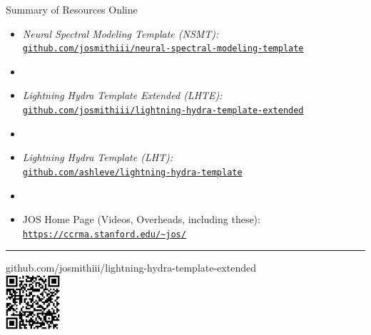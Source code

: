 \begin{slide}[\slideopts,toc={}]{Summary of Resources Online}
  \vspace{-1em}
  \begin{itemize}
    \item \emph{Neural Spectral Modeling Template (NSMT):}\\
      \href{https://github.com/josmithiii/neural-spectral-modeling-template.git}
           {\texttt{github.com/josmithiii/neural-spectral-modeling-template}}
    \item[]
    \item \emph{Lightning Hydra Template Extended (LHTE):}\\
      \href{https://github.com/josmithiii/lightning-hydra-template-extended.git}
           {\texttt{github.com/josmithiii/lightning-hydra-template-extended}}
    \item[]
    \item \emph{Lightning Hydra Template (LHT):}\\
      \href{https://github.com/ashleve/lightning-hydra-template}
           {\texttt{github.com/ashleve/lightning-hydra-template}}
    \item[]
    \item JOS Home Page (Videos, Overheads, including these):\\
      \href{https://ccrma.stanford.edu/~jos/Welcome.html}
           {\texttt{https://ccrma.stanford.edu/\~{}jos/}}
  \end{itemize}
  \hrule
  \vspace{2pt}
    {\scriptsize github.com/josmithiii/lightning-hydra-template-extended}\\
    \includegraphics[width=2cm]{eps/lhte_qr_code.eps}
\end{slide}
